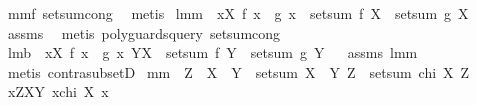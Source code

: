 \begin{isabellebody}
%
\isadelimproof
%
\endisadelimproof
%
\isatagproof
{}\isamarkupfalse%
\ mm{}{}f\ setsum{\isachardot}cong\ \isamarkupfalse%
\ metis%
\endisatagproof
{\isafoldproof}%
%
\isadelimproof
\isanewline
%
\endisadelimproof
\isanewline
{}\isamarkupfalse%
\ lmm{}{}{\isacharcolon}\ \ {\isachardoublequoteopen}{\isacharbang}x{\isacharcolon}X{\isachardot}\ f\ x\ {\isacharequal}\ g\ x{\isachardoublequoteclose}\ \ {\isachardoublequoteopen}setsum\ f\ X\ {\isacharequal}\ setsum\ g\ X{\isachardoublequoteclose}%
\isadelimproof
\ %
\endisadelimproof
%
\isatagproof
{}\isamarkupfalse%
\ assms\ \isanewline
{}\isamarkupfalse%
\ {\isacharparenleft}metis\ {\isacharparenleft}poly{\isacharunderscore}guards{\isacharunderscore}query{\isacharparenright}\ setsum{\isachardot}cong{\isacharparenright}%
\endisatagproof
{\isafoldproof}%
%
\isadelimproof
%
\endisadelimproof
\isanewline
{}\isamarkupfalse%
\ lm{}{}b{\isacharcolon}\ \ {\isachardoublequoteopen}{\isacharbang}x{\isacharcolon}X{\isachardot}\ f\ x\ {\isacharequal}\ g\ x{\isachardoublequoteclose}\ {\isachardoublequoteopen}Y{\isasymsubseteq}X{\isachardoublequoteclose}\ \ {\isachardoublequoteopen}setsum\ f\ Y\ {\isacharequal}\ setsum\ g\ Y{\isachardoublequoteclose}%
\isadelimproof
\ %
\endisadelimproof
%
\isatagproof
{}\isamarkupfalse%
\ assms\ lmm{}{}\isanewline
{}\isamarkupfalse%
\ {\isacharparenleft}metis\ contra{\isacharunderscore}subsetD{\isacharparenright}%
\endisatagproof
{\isafoldproof}%
%
\isadelimproof
%
\endisadelimproof
\isanewline
\isanewline
{}\isamarkupfalse%
\ mm{}{}{\isacharcolon}\ \ {\isachardoublequoteopen}Z\ {\isasymsubseteq}\ X\ {\isasymunion}\ Y{\isachardoublequoteclose}\ \ {\isachardoublequoteopen}setsum\ {\isacharparenleft}X\ {\isacharless}{\isacharbar}\ Y{\isacharparenright}\ Z\ {\isacharequal}\ setsum\ {\isacharparenleft}chi\ X{\isacharparenright}\ Z{\isachardoublequoteclose}\ \ \isanewline
%
\isadelimproof
%
\endisadelimproof
%
\isatagproof
{}\isamarkupfalse%
\ {\isacharminus}\ \isanewline
{}\isamarkupfalse%
\ {\isachardoublequoteopen}{\isacharbang}x{\isacharcolon}Z{\isachardot}{\isacharparenleft}X{\isacharless}{\isacharbar}Y{\isacharparenright}\ x{\isacharequal}{\isacharparenleft}chi\ X{\isacharparenright}\ x{\isachardoublequoteclose}\ \isamarkupfalse%

\end{isabellebody}
